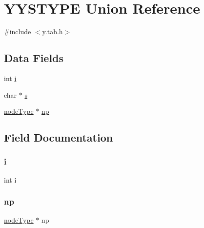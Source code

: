 \hypertarget{union_y_y_s_t_y_p_e}{}\section{Y\+Y\+S\+T\+Y\+PE Union Reference}
\label{union_y_y_s_t_y_p_e}


{\ttfamily \#include $<$y.\+tab.\+h$>$}

\subsection*{Data Fields}
\begin{DoxyCompactItemize}
\item 
int \hyperlink{union_y_y_s_t_y_p_e_acb559820d9ca11295b4500f179ef6392}{i}
\item 
char $\ast$ \hyperlink{union_y_y_s_t_y_p_e_a506da415c9307c897ca9be93acfe1d0f}{s}
\item 
\hyperlink{ast_8h_a5107519e23f35648044d9a2300d4a609}{node\+Type} $\ast$ \hyperlink{union_y_y_s_t_y_p_e_ad1d0044a91b406d4742de7cf1afe5970}{np}
\end{DoxyCompactItemize}


\subsection{Field Documentation}
\mbox{\label{union_y_y_s_t_y_p_e_acb559820d9ca11295b4500f179ef6392}} 
\subsubsection{\texorpdfstring{i}{i}}
{\footnotesize\ttfamily int i}

\mbox{\label{union_y_y_s_t_y_p_e_ad1d0044a91b406d4742de7cf1afe5970}} 
\subsubsection{\texorpdfstring{np}{np}}
{\footnotesize\ttfamily \hyperlink{ast_8h_a5107519e23f35648044d9a2300d4a609}{node\+Type} $\ast$ np}

\mbox{\label{union_y_y_s_t_y_p_e_a506da415c9307c897ca9be93acfe1d0f}} 
